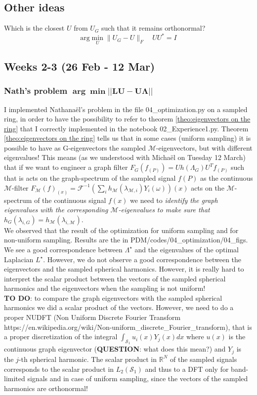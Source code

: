 \subsection*{Other ideas}

Which is the closest $U$ from $U_{G}$ such that it remains orthonormal?
\[
\text{arg}\min_{U}\|U_{G}-U\|_{F}\hspace{1em}UU^{*}=I
\]

\subsection{Weeks 2-3 (26 Feb - 12 Mar)}

\subsubsection*{Nath's problem $\mathbf{\arg \min ||LU-U\Lambda||}$}
I implemented Nathana\"el's problem in the file 04\_optimization.py on a sampled ring, in order to have the possibility to refer to theorem \ref{theo:eigenvectors on the ring} that I correctly implemented in the notebook 02\_Experience1.py. Theorem \ref{theo:eigenvectors on the ring} tells us that in some cases (uniform sampling) it is possible to have as G-eigenvectors the sampled $\mathcal{M}$-eigenvectors, but with different eigenvalues! This means (as we understood with Micha\"el on Tuesday 12 March) that if we want to engineer a graph filter $F_G(f_{(P)}) = Uh(\Lambda_G)U^Tf_{(P)}$ such that is acts on the graph-spectrum of the sampled signal $f(P)$ as the continuous $\mathcal{M}$-filter $F_\mathcal M(f)_{(x)} =  \mathcal F^{-1}\left(\sum_i h_{\mathcal M}(\lambda_{\mathcal M, i}) Y_i(\omega)\right)(x)$ acts on the $\mathcal M$-spectrum of the continuous signal $f(x)$ we need to \textit{identify the graph eigenvalues with the corresponding $\mathcal M$-eigenvalues to make sure that $h_G(\lambda_{i,G}) = h_{\mathcal M}(\lambda_{i,\mathcal M}) $}.\\
We observed that the result of the optimization for uniform sampling and for non-uniform sampling. Results are the in PDM/codes/04\_optimization/04\_figs. We see a good correspondence between $\Lambda^\star$ and the eigenvalues of the optimal Laplacian $L^\star$. However, we do not observe a good correspondence between the eigenvectors and the sampled spherical harmonics. However, it is really hard to interpret the scalar product between the vectors of the sampled spherical harmonics and the eigenvectors when the sampling is not uniform!\\
\textbf{TO DO}: to compare the graph eigenvectors with the sampled spherical harmonics we did a scalar product of the vectors. However, we need to do a proper NUDFT (Non Uniform Discrete Fourier Transform https://en.wikipedia.org/wiki/Non-uniform\_discrete\_Fourier\_transform), that is a proper discretization of the integral $\int_{\mathcal S_1} u_i(x) Y_j(x) dx$ where $u(x)$ is the continuous graph eigenvector (\textbf{QUESTION}: what does this mean?) and $Y_j$ is the $j$-th spherical harmonic. The scalar product in $\mathbb R^N$ of the sampled signals corresponds to the scalar product in $L_2(\mathcal S_1)$ and thus to a DFT only for band-limited signals and in case of uniform sampling, since the vectors of the sampled harmonics are orthonormal!
